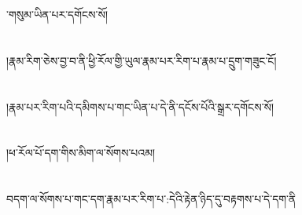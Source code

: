 ་གསུམ་ཡིན་པར་དགོངས་སོ།\chapter{ }།རྣམ་རིག་ཅེས་བྱ་བ་ནི་ཕྱི་རོལ་གྱི་ཡུལ་རྣམ་པར་རིག་པ་རྣམ་པ་དྲུག་གཟུང་ངོ།\chapter{ }།རྣམ་པར་རིག་པའི་དམིགས་པ་གང་ཡིན་པ་དེ་ནི་དངོས་པོའི་སྒྲར་དགོངས་སོ།\chapter{ }།ཕ་རོལ་པོ་དག་གིས་མིག་ལ་སོགས་པའམ།\chapter{ }བདག་ལ་སོགས་པ་གང་དག་རྣམ་པར་རིག་པ་:དེའི་རྟེན་ཉིད་དུ་བརྟགས་པ་དེ་དག་ནི